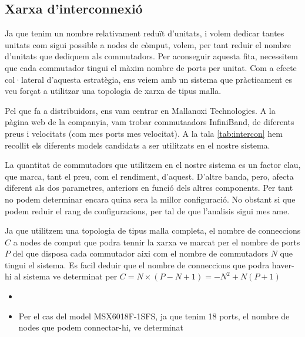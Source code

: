 \subsection{Xarxa d'interconnexió}

Ja que tenim un nombre relativament reduït d'unitats, i volem dedicar tantes unitats com 
sigui possible a nodes de còmput, volem, per tant reduir el nombre d'unitats que dediquem
als commutadors. Per aconseguir aquesta fita, necessitem que cada commutador tingui el màxim
nombre de ports per unitat.
Com a efecte col·lateral d'aquesta estratègia, ens veiem amb un sistema que pràcticament es
veu forçat a utilitzar una topologia de xarxa de tipus malla.

Pel que fa a distribuidors, ens vam centrar en Mallanoxi Technologies. A la pàgina web
\cite{mellanox-web} de la companyia, vam trobar commutaadors InfiniBand, de diferents preus
i velocitats (com mes ports mes velocitat). A la tala \ref{tab:intercon} hem recollit els 
diferents models candidats a ser utilitzats en el nostre sistema.

La quantitat de commutadors que utilitzem en el nostre sistema es un factor clau, que marca,
tant el preu, com el rendiment, d'aquest. D'altre banda, pero, afecta diferent als dos parametres,
anteriors en funció dels altres components. Per tant no podem determinar encara quina sera la
millor configuració. No obstant si que podem reduir el rang de configuracions, per tal de que
l'analisis sigui mes ame.

Ja que utilitzem una topologia de tipus malla completa, el nombre de conneccions $C$ a nodes de comput
que podra tennir la xarxa ve marcat per el nombre de ports $P$ del que disposa cada commutador aixi
com el nombre de commutadors $N$ que tingui el sistema. Es facil deduir que el nombre de conneccions
que podra haver-hi al sistema ve determinat per $C = N \times ( P - N + 1 ) = -N^2 + N(P+1)$
\begin{itemize}
  \item 
  \item Per el cas del model MSX6018F-1SFS, ja que tenim 18 ports, el nombre de nodes que
    podem connectar-hi, ve determinat
\end{itemize}

